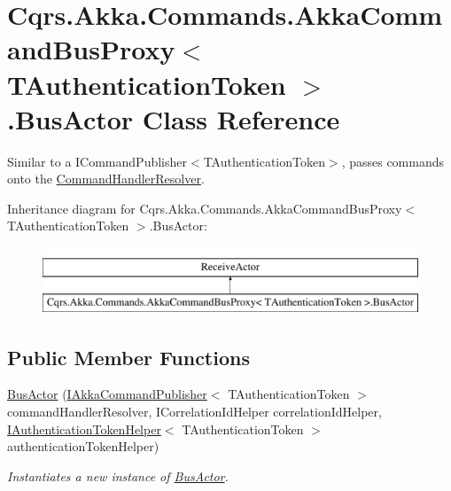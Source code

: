 \hypertarget{classCqrs_1_1Akka_1_1Commands_1_1AkkaCommandBusProxy_1_1BusActor}{}\section{Cqrs.\+Akka.\+Commands.\+Akka\+Command\+Bus\+Proxy$<$ T\+Authentication\+Token $>$.Bus\+Actor Class Reference}
\label{classCqrs_1_1Akka_1_1Commands_1_1AkkaCommandBusProxy_1_1BusActor}


Similar to a I\+Command\+Publisher$<$\+T\+Authentication\+Token$>$, passes commands onto the \hyperlink{classCqrs_1_1Akka_1_1Commands_1_1AkkaCommandBusProxy_1_1BusActor_a097e43f25d55e632c2c5da9d0255d180_a097e43f25d55e632c2c5da9d0255d180}{Command\+Handler\+Resolver}.  


Inheritance diagram for Cqrs.\+Akka.\+Commands.\+Akka\+Command\+Bus\+Proxy$<$ T\+Authentication\+Token $>$.Bus\+Actor\+:\begin{figure}[H]
\begin{center}
\leavevmode
\includegraphics[height=2.000000cm]{classCqrs_1_1Akka_1_1Commands_1_1AkkaCommandBusProxy_1_1BusActor}
\end{center}
\end{figure}
\subsection*{Public Member Functions}
\begin{DoxyCompactItemize}
\item 
\hyperlink{classCqrs_1_1Akka_1_1Commands_1_1AkkaCommandBusProxy_1_1BusActor_a5ddecec1b6333aaf89dbff824cf6ddd2_a5ddecec1b6333aaf89dbff824cf6ddd2}{Bus\+Actor} (\hyperlink{interfaceCqrs_1_1Akka_1_1Commands_1_1IAkkaCommandPublisher}{I\+Akka\+Command\+Publisher}$<$ T\+Authentication\+Token $>$ command\+Handler\+Resolver, I\+Correlation\+Id\+Helper correlation\+Id\+Helper, \hyperlink{interfaceCqrs_1_1Authentication_1_1IAuthenticationTokenHelper}{I\+Authentication\+Token\+Helper}$<$ T\+Authentication\+Token $>$ authentication\+Token\+Helper)
\begin{DoxyCompactList}\small\item\em Instantiates a new instance of \hyperlink{classCqrs_1_1Akka_1_1Commands_1_1AkkaCommandBusProxy_1_1BusActor}{Bus\+Actor}. \end{DoxyCompactList}\end{DoxyCompactItemize}
